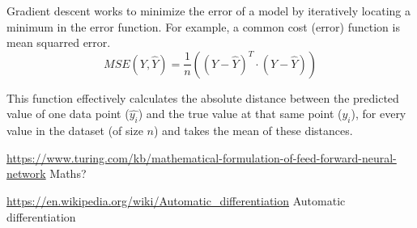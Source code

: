 \documentclass{article}
\begin{document}
    Gradient descent works to minimize the error of a model by iteratively locating a minimum in the error function.
    For example, a common cost (error) function is mean squarred error.
    \begin{displaymath}
        MSE(Y, \hat{Y}) = \frac{1}{n}((Y - \hat{Y})^T \cdot (Y - \hat{Y}))
    \end{displaymath}

    This function effectively calculates the absolute distance between the predicted value of one data point ($\hat{y_i}$) and the true value at that same point ($y_i$),
    for every value in the dataset (of size $n$) and takes the mean of these distances.

    \pagebreak
    \noindent \url{https://www.turing.com/kb/mathematical-formulation-of-feed-forward-neural-network} Maths?

    \noindent \url{https://en.wikipedia.org/wiki/Automatic_differentiation} Automatic differentiation
\end{document}
